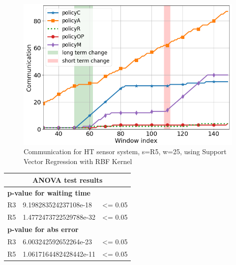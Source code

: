 \documentclass{mpaper}
\begin{document}
\begin{figure}
    \centering
    \includegraphics[scale=0.34]{imgs/comm_svr_rbf_R5.png}
    \caption{Communication for HT sensor system, s=R5, w=25, using Support Vector Regression with RBF Kernel}
    \label{fig:comm_rbf_svr_R5}
\end{figure}


\begin{table}[]
\begin{tabular}{|l|l|l|}
\hline
\multicolumn{3}{|c|}{\cellcolor[HTML]{DAE8FC}\textbf{ANOVA test results}}       \\ \hline
\multicolumn{3}{|l|}{\cellcolor[HTML]{FFFFFF}\textbf{p-value for waiting time}} \\ \hline
R3    & 9.198283524237108e-18     & \textless{}= 0.05                           \\ \hline
R5    & 1.4772473722529788e-32    & \textless{}= 0.05                           \\ \hline
\multicolumn{3}{|l|}{\cellcolor[HTML]{FFFFFF}\textbf{p-value for abs error}}    \\ \hline
R3    & 6.003242592652264e-23     & \textless{}= 0.05                           \\ \hline
R5    & 1.0617164482428442e-11    & \cellcolor[HTML]{FFFFFF}\textless{}= 0.05   \\ \hline
\end{tabular}
\end{table}
\end{document}
